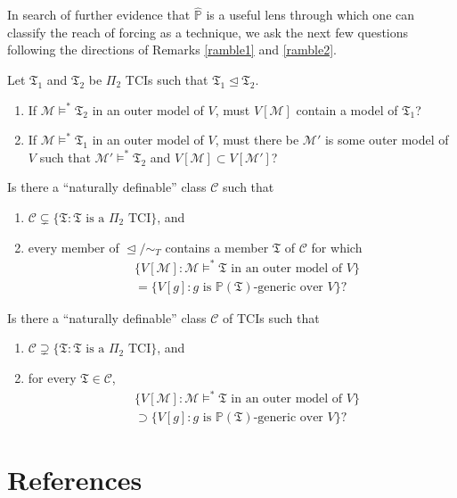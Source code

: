 \documentclass[12pt]{article}
\numberwithin{equation}{section}
\begin{document}
In search of further evidence that $\hat{\mathbb{P}}$ is a useful lens through which one can classify the reach of forcing as a technique, we ask the next few questions following the directions of Remarks \ref{ramble1} and \ref{ramble2}.

\begin{ques}
Let $\mathfrak{T}_1$ and $\mathfrak{T}_2$ be $\Pi_2$ TCIs such that $\mathfrak{T}_1 \trianglelefteq \mathfrak{T}_2$.
\begin{enumerate}[label=(\arabic*)]
    \item If $\mathcal{M} \models^* \mathfrak{T}_2$ in an outer model of $V$, must $V[\mathcal{M}]$ contain a model of $\mathfrak{T}_1$?
    \item If $\mathcal{M} \models^* \mathfrak{T}_1$ in an outer model of $V$, must there be $\mathcal{M}'$ is some outer model of $V$ such that $\mathcal{M}' \models^* \mathfrak{T}_2$ and $V[\mathcal{M}] \subset V[\mathcal{M}']$?
\end{enumerate}
\end{ques}

\begin{ques}
Is there a ``naturally definable'' class $\mathcal{C}$ such that 
\begin{enumerate}[label=(\alph*)]
    \item $\mathcal{C} \subsetneq \{\mathfrak{T} : \mathfrak{T} \text{ is a } \Pi_2 \text{ TCI}\}$, and
    \item every member of $\trianglelefteq / \sim_T$ contains a member $\mathfrak{T}$ of $\mathcal{C}$ for which
    \begin{align*}
        & \{V[\mathcal{M}] : \mathcal{M} \models^* \mathfrak{T} \text{ in an outer model of } V\} \\
        & = \{V[g] : g \text{ is } \mathbb{P}(\mathfrak{T}) \text{-generic over } V\} \text{?}
    \end{align*}
\end{enumerate} 
\end{ques}

\begin{ques}
Is there a ``naturally definable'' class $\mathcal{C}$ of TCIs such that 
\begin{enumerate}[label=(\alph*)]
    \item $\mathcal{C} \supsetneq \{\mathfrak{T} : \mathfrak{T} \text{ is a } \Pi_2 \text{ TCI}\}$, and
    \item for every $\mathfrak{T} \in \mathcal{C}$, 
    \begin{align*}
        & \{V[\mathcal{M}] : \mathcal{M} \models^* \mathfrak{T} \text{ in an outer model of } V\} \\
        & \supset \{V[g] : g \text{ is } \mathbb{P}(\mathfrak{T}) \text{-generic over } V\} \text{?}
    \end{align*}
\end{enumerate} 
\end{ques}

\section{References}
\printbibliography[heading=none]
\end{document}
